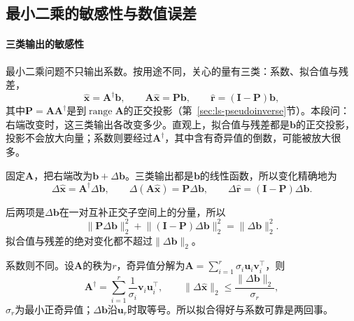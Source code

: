 \subsection{最小二乘的敏感性与数值误差}
\label{sec:ls-ls-regularization-sensitivity}

\paragraph{三类输出的敏感性}
最小二乘问题不只输出系数。按用途不同，关心的量有三类：系数、拟合值与残差，
\begin{equation}
 \hat{\bm x}=\bm A^\dagger\bm b,\qquad \bm A\hat{\bm x}=\bm P\bm b,\qquad \hat{\bm r}=(\bm I-\bm P)\bm b,
 \label{eq:ls-ls-three-outputs}
\end{equation}
其中$\bm P=\bm A\bm A^\dagger$是到$\operatorname{range}\bm A$的正交投影（第~\ref{sec:ls-pseudoinverse}节）。本段问：右端改变时，这三类输出各改变多少。直观上，拟合值与残差都是$\bm b$的正交投影，投影不会放大向量；系数则要经过$\bm A^\dagger$，其中含有奇异值的倒数，可能被放大很多。

固定$\bm A$，把右端改为$\bm b+\Delta\bm b$。三类输出都是$\bm b$的线性函数，所以变化精确地为
\begin{equation}
 \Delta\hat{\bm x}=\bm A^\dagger\Delta\bm b,\qquad
 \Delta(\bm A\hat{\bm x})=\bm P\Delta\bm b,\qquad
 \Delta\hat{\bm r}=(\bm I-\bm P)\Delta\bm b .
 \label{eq:ls-ls-output-perturbations}
\end{equation}

后两项是$\Delta\bm b$在一对互补正交子空间上的分量，所以
\[
 \lVert\bm P\Delta\bm b\rVert_2^2+\lVert(\bm I-\bm P)\Delta\bm b\rVert_2^2=\lVert\Delta\bm b\rVert_2^2 .
\]
拟合值与残差的绝对变化都不超过$\lVert\Delta\bm b\rVert_2$。

系数则不同。设$\bm A$的秩为$r$，奇异值分解为$\bm A=\sum_{i=1}^r\sigma_i\bm u_i\bm v_i^\top$，则
\begin{equation}
 \bm A^\dagger=\sum_{i=1}^r\frac1{\sigma_i}\bm v_i\bm u_i^\top,\qquad
 \lVert\Delta\hat{\bm x}\rVert_2\leq\frac{\lVert\Delta\bm b\rVert_2}{\sigma_r},
 \label{eq:ls-ls-coefficient-sensitivity-bound}
\end{equation}
$\sigma_r$为最小正奇异值；$\Delta\bm b$沿$\bm u_r$时取等号。所以拟合得好与系数可靠是两回事。

